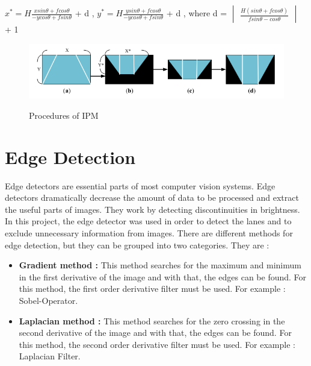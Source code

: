  \begin{center}
 $x^* = H \frac{x sin \theta + f cos \theta}{-y cos \theta + f sin \theta}$ + d ,
 $y^* = H \frac{y sin \theta + f cos \theta}{-y cos \theta + f sin \theta}$ + d ,
 where d = 
 $\begin{vmatrix}
 \frac{H(sin \theta + f cos \theta)}{f sin \theta - cos \theta}
 \end{vmatrix}$ + 1
\end{center}

\begin{figure}[H]
 \centering
  \includegraphics[width=1\textwidth]{./Bilder/Procedures_of_IPM.png}\label{Procedures_of_IPM}
  \caption{Procedures of IPM}
\end{figure}


%
\section{Edge Detection}\label{sec:Edge Detection}
%

Edge detectors are essential parts of most computer vision systems. Edge detectors dramatically decrease the amount of data to be processed and extract the useful parts of images. They work by detecting discontinuities in brightness. In this project, the edge detector was used in order to detect the lanes and to exclude unnecessary information from images. There are different methods for edge detection, but they can be grouped into two categories. They are :

\begin{itemize}

\item \textbf{Gradient method : } This method searches for the maximum and minimum in the first derivative of the image and with that, the edges can be found. For this method, the first order derivative filter must be used. For example : Sobel-Operator.
 
\item \textbf{Laplacian method : } This method searches for the zero crossing in the second derivative of the image and with that, the edges can be found. For this method, the second order derivative filter must be used. For example : Laplacian Filter. 
  
\end{itemize}
 
